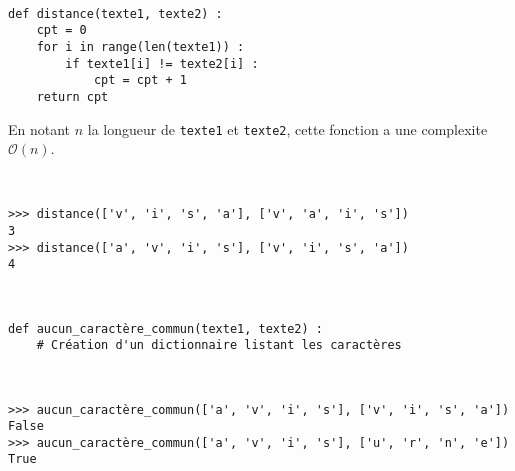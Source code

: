 \ifprof
\begin{corrige}~\\ 
\vspace{-.5cm}
\begin{lstlisting}
def distance(texte1, texte2) :
    cpt = 0
    for i in range(len(texte1)) : 
        if texte1[i] != texte2[i] :
            cpt = cpt + 1
    return cpt
\end{lstlisting}
En notant $n$ la longueur de \lstinline{texte1} et \lstinline{texte2}, cette fonction a une complexite $\mathcal{O}(n)$.
\end{corrige}
\else
\fi

\begin{exemple}~\\ 
\vspace{-.5cm}
\begin{lstlisting}
>>> distance(['v', 'i', 's', 'a'], ['v', 'a', 'i', 's'])
3
>>> distance(['a', 'v', 'i', 's'], ['v', 'i', 's', 'a'])
4
\end{lstlisting}
\end{exemple}

\ifprof
\begin{corrige}~\\ 
\vspace{-.5cm}
\begin{lstlisting}
def aucun_caractère_commun(texte1, texte2) :
    # Création d'un dictionnaire listant les caractères
\end{lstlisting}
\end{corrige}
\else
\fi


\begin{exemple}~\\ 
\vspace{-.5cm}
\begin{lstlisting}
>>> aucun_caractère_commun(['a', 'v', 'i', 's'], ['v', 'i', 's', 'a'])
False
>>> aucun_caractère_commun(['a', 'v', 'i', 's'], ['u', 'r', 'n', 'e'])
True
\end{lstlisting}
\end{exemple}

